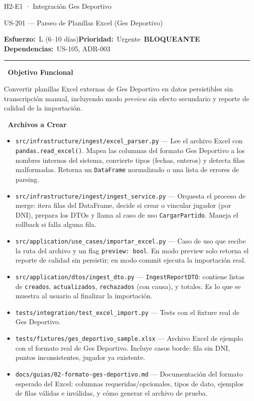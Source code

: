 \documentclass[11pt,a4paper]{article}
\newcommand{\fpath}[1]{\texttt{\small #1}}
\newcommand{\usfield}[2][\;]{%
  \par\vspace{5pt}%
  {\small\textbf{\textcolor{primary}{#2}}}\par\vspace{2pt}%
}
\newcommand{\usmeta}[3]{%
  \vspace{2pt}%
  {\small\textcolor{secondary}{%
    \textbf{Esfuerzo:}~#1\quad\textbf{Prioridad:}~#2\quad\textbf{Dependencias:}~#3%
  }}%
  \par\vspace{4pt}%
  \textcolor{bordergray}{\rule{\linewidth}{0.4pt}}\par\vspace{4pt}%
}
\newcommand{\tagblocking}{\,\colorbox{tagblue}{\tiny\bfseries BLOQUEANTE}\,}
\begin{document}
\begin{epicbox}{H2-E1 · Integración Ges Deportivo}
\end{epicbox}

\begin{uscard}{US-201 — Parseo de Planillas Excel (Ges Deportivo)}

\usmeta{L (6–10 días)}{Urgente \tagblocking}{US-105, ADR-003}

\usfield{\faAlignLeft\ Objetivo Funcional}
Convertir planillas Excel externas de Ges Deportivo en datos persistibles sin transcripción manual, incluyendo modo \textit{preview} sin efecto secundario y reporte de calidad de la importación.

\usfield{\faFolderOpen\ Archivos a Crear}
\begin{itemize}[nosep, leftmargin=1.6em]
  \item \fpath{src/infrastructure/ingest/excel\_parser.py} — Lee el archivo Excel con \fpath{pandas.read\_excel()}. Mapea las columnas del formato Ges Deportivo a los nombres internos del sistema, convierte tipos (fechas, enteros) y detecta filas malformadas. Retorna un \fpath{DataFrame} normalizado o una lista de errores de parsing.
  \item \fpath{src/infrastructure/ingest/ingest\_service.py} — Orquesta el proceso de merge: itera filas del DataFrame, decide si crear o vincular jugador (por DNI), prepara los DTOs y llama al caso de uso \fpath{CargarPartido}. Maneja el rollback si falla alguna fila.
  \item \fpath{src/application/use\_cases/importar\_excel.py} — Caso de uso que recibe la ruta del archivo y un flag \fpath{preview: bool}. En modo preview solo retorna el reporte de calidad sin persistir; en modo commit ejecuta la importación real.
  \item \fpath{src/application/dtos/ingest\_dto.py} — \fpath{IngestReportDTO}: contiene listas de \fpath{creados}, \fpath{actualizados}, \fpath{rechazados} (con causa), y totales. Es lo que se muestra al usuario al finalizar la importación.
  \item \fpath{tests/integration/test\_excel\_import.py} — Tests con el fixture real de Ges Deportivo.
  \item \fpath{tests/fixtures/ges\_deportivo\_sample.xlsx} — Archivo Excel de ejemplo con el formato real de Ges Deportivo. Incluye casos borde: fila sin DNI, puntos inconsistentes, jugador ya existente.
  \item \fpath{docs/guias/02-formato-ges-deportivo.md} — Documentación del formato esperado del Excel: columnas requeridas/opcionales, tipos de dato, ejemplos de filas válidas e inválidas, y cómo generar el archivo de prueba.
\end{itemize}


\end{uscard}
\end{document}
